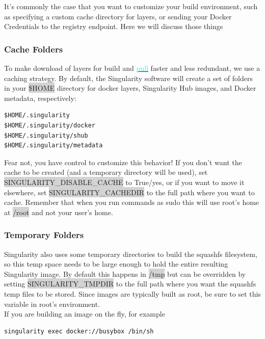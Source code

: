 \documentclass[a4paper]{article}
\begin{document}
It’s commonly the case that you want to customize your build environment, such as specifying a custom cache directory for layers, or sending your Docker Credentials to the registry endpoint. Here we will discuss those things

\subsubsection{Cache Folders}

To make download of layers for build and \hyperref[sec:pull]{{\textcolor{cyan}{pull}}} faster and less redundant, we use a caching strategy. By default, the Singularity software will create a set of folders in your  \colorbox{lightgray}{\$HOME} directory for docker layers, Singularity Hub images, and Docker metadata, respectively:

\begin{lstlisting}[frame=single] 
$HOME/.singularity
$HOME/.singularity/docker
$HOME/.singularity/shub
$HOME/.singularity/metadata 
\end{lstlisting}

Fear not, you have control to customize this behavior! If you don’t want the cache to be created (and a temporary directory will be used), set \colorbox{lightgray}{SINGULARITY\_DISABLE\_CACHE} to True/yes, or if you want to move it elsewhere, set \colorbox{lightgray}{SINGULARITY\_CACHEDIR} to the full path where you want to cache. Remember that when you run commands as sudo this will use root’s home at \colorbox{lightgray}{/root} and not your user’s home.
\subsubsection{Temporary Folders}
\label{sec:temporaryfolders}
Singularity also uses some temporary directories to build the squashfs filesystem, so this temp space needs to be large enough to hold the entire resulting Singularity image. By default this happens in \colorbox{lightgray}{/tmp} but can be overridden by setting \colorbox{lightgray}{SINGULARITY\_TMPDIR} to the full path where you want the squashfs temp files to be stored. Since images are typically built as root, be sure to set this variable in root’s environment.
\\[0.1in]
If you are building an image on the fly, for example

\begin{lstlisting}[frame=single]
singularity exec docker://busybox /bin/sh 
\end{lstlisting}
\end{document}
